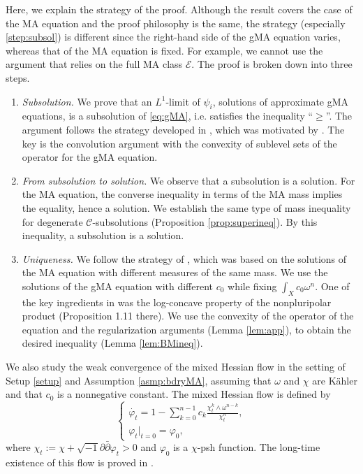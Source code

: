 \documentclass{amsart}
\numberwithin{equation}{section}
\theoremstyle{plain}
\theoremstyle{definition}
\theoremstyle{remark}
\newcommand{\delb}{\sqrt{-1}\partial\bar{\partial}}
\begin{document}
Here, we explain the strategy of the proof. Although the result covers the case of the MA equation and the proof philosophy is the same, the strategy (especially \ref{step:subsol}) is different since the right-hand side of the gMA equation varies, whereas that of the MA equation is fixed. For example, we cannot use the argument that relies on the full MA class $\mathcal{E}$. 
The proof is broken down into three steps. 

\begin{enumerate}[label={Step \arabic*}]
    \item\label{step:subsol} \textit{Subsolution.} We prove that an $L^1$-limit of $\psi_i$, solutions of approximate gMA equations, is a subsolution of \eqref{eq:gMA}, i.e. satisfies the inequality ``$\ge$''. The argument follows the strategy developed in \cite{Mur}, which was motivated by \cite[Proposition 21]{CS17}. The key is the convolution argument with the convexity of sublevel sets of the operator for the gMA equation.
    
    \item\label{step:sol} \textit{From subsolution to solution.} We observe that a subsolution is a solution. For the MA equation, the converse inequality in terms of the MA mass \cite[Proposition 1.20]{BEGZ} implies the equality, hence a solution. We establish the same type of mass inequality for degenerate $\mathcal{C}$-subsolutions (Proposition \ref{prop:superineq}). By this inequality, a subsolution is a solution.

    \item\label{step:uni} \textit{Uniqueness.} We follow the strategy of \cite[Section 3.3]{BEGZ}, which was based on the solutions of the MA equation with different measures of the same mass. We use the solutions of the gMA equation with different $c_0$ while fixing $\int_Xc_0\omega^n$. One of the key ingredients in \cite[Section 3.3]{BEGZ} was the log-concave property of the nonpluripolar product (Proposition 1.11 there). We use the convexity of the operator of the equation and the regularization arguments (Lemma \ref{lem:app}), to obtain the desired inequality (Lemma \ref{lem:BMineq}).
\end{enumerate}

We also study the weak convergence of the mixed Hessian flow in the setting of Setup \ref{setup} and Assumption \ref{asmp:bdryMA}, assuming that $\omega$ and $\chi$ are Kähler and that $c_0$ is a nonnegative constant.
The mixed Hessian flow is defined by
\begin{equation*}
    \begin{cases}
        \dot{\varphi_t}=1-\sum_{k=0}^{n-1}c_k\frac{\chi_t^k\wedge\omega^{n-k}}{\chi_t^n},\\
        \varphi_t|_{t=0}=\varphi_0,
    \end{cases}
\end{equation*}
where $\chi_t:=\chi+\delb \varphi_t>0$ and $\varphi_0$ is a $\chi$-psh function. The long-time existence of this flow is proved in \cite[Proposition 13]{CS17}.
\end{document}
